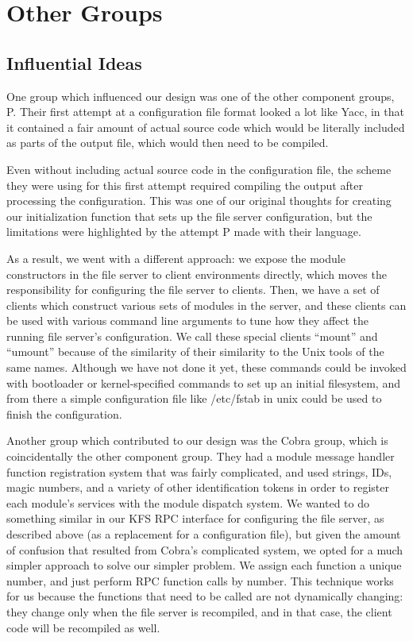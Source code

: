 \section{Other Groups}
\label{sec:groups}

\subsection{Influential Ideas}
\label{sec:groups:ideas}

One group which influenced our design was one of the other component groups, P.
Their first attempt at a configuration file format looked a lot like Yacc, in
that it contained a fair amount of actual source code which would be literally
included as parts of the output file, which would then need to be compiled.

Even without including actual source code in the configuration file, the scheme
they were using for this first attempt required compiling the output after
processing the configuration. This was one of our original thoughts for creating
our initialization function that sets up the file server configuration, but
the limitations were highlighted by the attempt P made with their language.

As a result, we went with a different approach: we expose the module
constructors in the file server to client environments directly, which moves the
responsibility for configuring the file server to clients. Then, we have a set
of clients which construct various sets of modules in the server, and these
clients can be used with various command line arguments to tune how they affect
the running file server's configuration. We call these special clients ``mount''
and ``umount'' because of the similarity of their similarity to the Unix tools
of the same names. Although we have not done it yet, these commands could be
invoked with bootloader or kernel-specified commands to set up an initial
filesystem, and from there a simple configuration file like /etc/fstab in unix
could be used to finish the configuration.

Another group which contributed to our design was the Cobra group, which is
coincidentally the other component group. They had a module message handler
function registration system that was fairly complicated, and used strings,
IDs, magic numbers, and a variety of other identification tokens in order to
register each module's services with the module dispatch system. We wanted to do
something similar in our KFS RPC interface for configuring the file server, as
described above (as a replacement for a configuration file), but given the
amount of confusion that resulted from Cobra's complicated system, we opted for
a much simpler approach to solve our simpler problem. We assign each function a
unique number, and just perform RPC function calls by number. This technique
works for us because the functions that need to be called are not dynamically
changing: they change only when the file server is recompiled, and in that case,
the client code will be recompiled as well.


